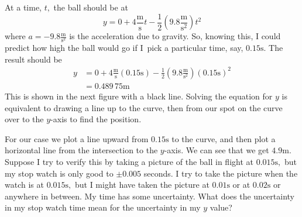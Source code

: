 \documentclass[twoside,11pt,ShortChapTitles]{BYUTextbook}
\begin{document}
At a time, $t,$ the ball should be at
\[
y=0+4\frac{
\text{m}
}{
\text{s}
}t-\frac{1}{2}\left(  9.8\frac{
\text{m}
}{
\text{s}
^{2}}\right)  t^{2}
\]
where $a=-9.8\frac{
\text{m}
}{
\text{s}
^{2}}$ is the acceleration due to gravity. So, knowing this, I could predict
how high the ball would go if I\ pick a particular time, say, $0.15
\text{s}
.$ The result should be
\begin{align*}
y  & =0+4\frac{
\text{m}
}{
\text{s}
}\left(  0.15
\text{s}
\right)  -\frac{1}{2}\left(  9.8\frac{
\text{m}
}{
\text{s}
^{2}}\right)  \left(  0.15
\text{s}
\right)  ^{2}\\
& =0.489\,75
\text{m}
\end{align*}
This is shown in the next figure with a black line. Solving the equation for
$y$ is equivalent to drawing a line up to the curve, then from our spot on the
curve over to the $y$-axis to find the position.
\begin{center}
\end{center}


For our case we plot a line upward from $0.15
\text{s}
$ to the curve, and then plot a horizontal line from the intersection to the
$y$-axis. We can see that we get $4.9
\text{m}
.$ Suppose I try to verify this by taking a picture of the ball in flight at
$0.015
\text{s}
,$ but my stop watch is only good to $\pm0.005$ seconds. I try to take the
picture when the watch is at $0.015
\text{s}
,$ but I might have taken the picture at $0.01
\text{s}
$ or at $0.02
\text{s}
$ or anywhere in between. My time has some uncertainty. What does the
uncertainty in my stop watch time mean for the uncertainty in my $y$ value?
\end{document}
